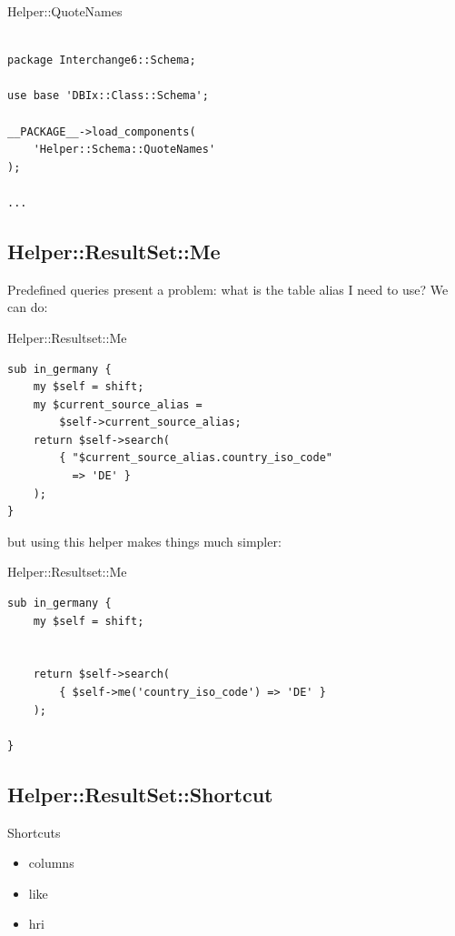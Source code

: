 \begin{frame}[fragile]{Helper::QuoteNames}
\begin{lstlisting}

package Interchange6::Schema;

use base 'DBIx::Class::Schema';

__PACKAGE__->load_components( 
    'Helper::Schema::QuoteNames' 
);

...

\end{lstlisting}
\end{frame}

\subsection{Helper::ResultSet::Me}

Predefined queries present a problem: what is the table alias I need to use?
We can do:

\begin{frame}[fragile]{Helper::Resultset::Me}
\begin{lstlisting}
sub in_germany {
    my $self = shift;
    my $current_source_alias =
        $self->current_source_alias;
    return $self->search(
        { "$current_source_alias.country_iso_code"
          => 'DE' }
    );
}
\end{lstlisting}
\end{frame}

but using this helper makes things much simpler:

\begin{frame}[fragile]{Helper::Resultset::Me}
\begin{lstlisting}
sub in_germany {
    my $self = shift;


    return $self->search(
        { $self->me('country_iso_code') => 'DE' }
    );

}
\end{lstlisting}
\end{frame}

\subsection{Helper::ResultSet::Shortcut}




\begin{frame}{Shortcuts}
\begin{itemize}
\item columns
\item like
\item hri
\end{itemize}
\end{frame}

